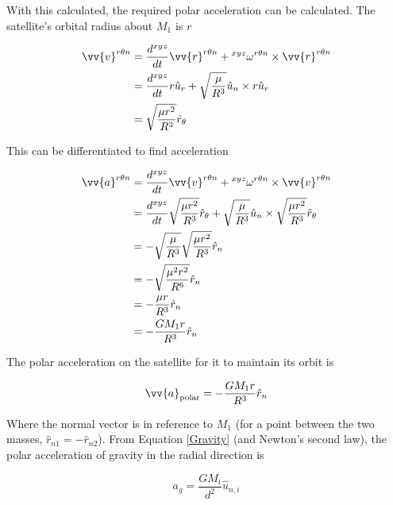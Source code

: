 \documentclass[../basicOrbitalDynamics.tex]{subfiles}
\begin{document}
With this calculated, the required polar acceleration can be calculated. The satellite's orbital radius about $M_1$ is $r$

\begin{align*}
    \vv{v}^{r\theta{}n} & =\frac{d^{xyz}}{dt}{\vv{r}^{r\theta{}n}}+\prescript{xyz}{}{\omega}^{r\theta{}n}\times{}\vv{r}^{r\theta{}n} \\
    & =\frac{d^{xyz}}{dt}{r\hat{u}_r}+\sqrt{\frac{\mu}{R^3}}\hat{u}_n\times r\hat{u}_r\\
    & =\sqrt{\frac{\mu r^2}{R^3}}\hat{r}_\theta \\
\end{align*}

This can be differentiated to find acceleration

\begin{align*}
    \vv{a}^{r\theta{}n} & =\frac{d^{xyz}}{dt}{\vv{v}^{r\theta{}n}}+\prescript{xyz}{}{\omega}^{r\theta{}n}\times{}\vv{v}^{r\theta{}n}   \\
    & =\frac{d^{xyz}}{dt}\sqrt{\frac{\mu r^2}{R^3}}\hat{r}_\theta+\sqrt{\frac{\mu}{R^3}}\hat{u}_n\times \sqrt{\frac{\mu r^2}{R^3}}\hat{r}_\theta \\
    & =-\sqrt{\frac{\mu}{R^3}}\sqrt{\frac{\mu r^2}{R^3}}\hat{r}_n\\
    & =-\sqrt{\frac{\mu^2 r^2}{R^6}}\hat{r}_n\\
    & =-\frac{\mu r}{R^3}\hat{r}_n \\
    & =-\frac{GM_1r}{R^3}\hat{r}_n \\
\end{align*}

The polar acceleration on the satellite for it to maintain its orbit is

$$\st{\vv{a}}{polar}=-\frac{GM_1r}{R^3}\hat{r}_n$$

Where the normal vector is in reference to $M_1$ (for a point between the two masses, $\hat{r}_{n1}=-\hat{r}_{n2}$). From Equation \eqref{Gravity} (and Newton's second law), the polar acceleration of gravity in the radial direction is

$$a_g=\frac{GM_i}{d^2}\hat{u}_{n,i}$$
\end{document}
